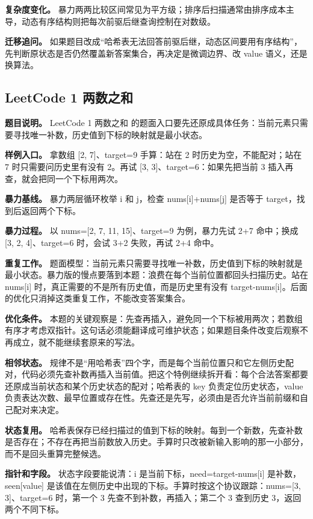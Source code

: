 \textbf{复杂度变化。} 暴力两两比较区间常见为平方级；排序后扫描通常由排序成本主导，动态有序结构则把每次前驱后继查询控制在对数级。

\textbf{迁移追问。} 如果题目改成“哈希表无法回答前驱后继，动态区间要用有序结构”，先判断原状态是否仍然覆盖新答案集合，再决定是微调边界、改 value 语义，还是换算法。

\subsection{LeetCode 1 两数之和}

\textbf{题目说明。} LeetCode 1 两数之和 的题面入口要先还原成具体任务：当前元素只需要寻找唯一补数，历史值到下标的映射就是最小状态。

\textbf{样例入口。} 拿数组 [2, 7]、target=9 手算：站在 2 时历史为空，不能配对；站在 7 时只需要问历史里有没有 2。再试 [3, 3]、target=6：如果先把当前 3 插入再查，就会把同一个下标用两次。

\textbf{暴力基线。} 暴力两层循环枚举 i 和 j，检查 nums[i]+nums[j] 是否等于 target，找到后返回两个下标。

\textbf{暴力过程。} 以 nums=[2, 7, 11, 15]、target=9 为例，暴力先试 2+7 命中；换成 [3, 2, 4]、target=6 时，会试 3+2 失败，再试 2+4 命中。

\textbf{重复工作。} 题面模型：当前元素只需要寻找唯一补数，历史值到下标的映射就是最小状态。暴力版的慢点要落到本题：浪费在每个当前位置都回头扫描历史。站在 nums[i] 时，真正需要的不是所有历史值，而是历史里有没有 target-nums[i]。后面的优化只消掉这类重复工作，不能改变答案集合。

\textbf{优化条件。} 本题的关键观察是：先查再插入，避免同一个下标被用两次；若数组有序才考虑双指针。这句话必须能翻译成可维护状态；如果题目条件改变后观察不再成立，就不能继续套原来的写法。

\textbf{相邻状态。} 规律不是“用哈希表”四个字，而是每个当前位置只和它左侧历史配对，代码必须先查补数再插入当前值。把这个特例继续拆开看：每个合法答案都要还原成当前状态和某个历史状态的配对；哈希表的 key 负责定位历史状态，value 负责表达次数、最早位置或存在性。先查还是先写，必须由是否允许当前前缀和自己配对来决定。

\textbf{状态复用。} 哈希表保存已经扫描过的值到下标的映射。每到一个新数，先查补数是否存在；不存在再把当前数放入历史。手算时只改被新输入影响的那一小部分，而不是回头重算完整候选。

\textbf{指针和字段。} 状态字段要能说清：i 是当前下标，need=target-nums[i] 是补数，seen[value] 是该值在左侧历史中出现的下标。手算时按这个协议跟踪：nums=[3, 3]、target=6 时，第一个 3 先查不到补数，再插入；第二个 3 查到历史 3，返回两个不同下标。

